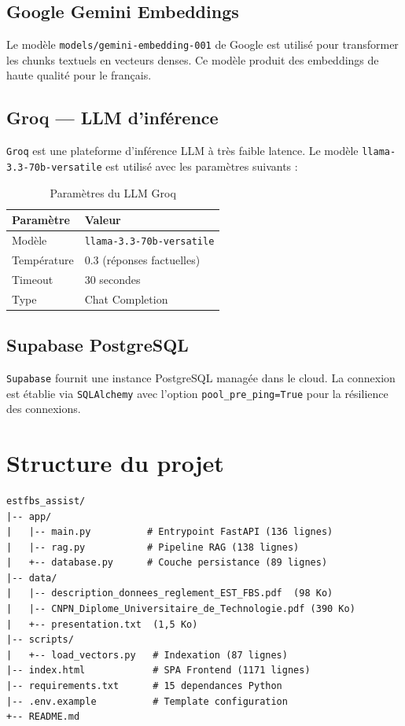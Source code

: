 \documentclass[12pt, a4paper, twoside]{report}
\newcommand{\tech}[1]{\texttt{\color{accent}#1}}
\begin{document}
\subsection{Google Gemini Embeddings}

Le modèle \texttt{models/gemini-embedding-001} de Google est utilisé pour transformer les chunks textuels en vecteurs denses. Ce modèle produit des embeddings de haute qualité pour le français.

\subsection{Groq --- LLM d'inférence}

\tech{Groq} est une plateforme d'inférence LLM à très faible latence. Le modèle \texttt{llama-3.3-70b-versatile} est utilisé avec les paramètres suivants :

\begin{table}[H]
\centering
\caption{Paramètres du LLM Groq}
\label{tab:llm}
\begin{tabular}{ll}
\toprule
\textbf{Paramètre} & \textbf{Valeur} \\
\midrule
Modèle         & \texttt{llama-3.3-70b-versatile} \\
Température    & 0.3 (réponses factuelles) \\
Timeout        & 30 secondes \\
Type           & Chat Completion \\
\bottomrule
\end{tabular}
\end{table}

\subsection{Supabase PostgreSQL}

\tech{Supabase} fournit une instance PostgreSQL managée dans le cloud. La connexion est établie via \tech{SQLAlchemy} avec l'option \texttt{pool\_pre\_ping=True} pour la résilience des connexions.

\section{Structure du projet}

\begin{lstlisting}[language={}, caption={Arborescence du projet}, label={lst:arbo}]
estfbs_assist/
|-- app/
|   |-- main.py          # Entrypoint FastAPI (136 lignes)
|   |-- rag.py           # Pipeline RAG (138 lignes)
|   +-- database.py      # Couche persistance (89 lignes)
|-- data/
|   |-- description_donnees_reglement_EST_FBS.pdf  (98 Ko)
|   |-- CNPN_Diplome_Universitaire_de_Technologie.pdf (390 Ko)
|   +-- presentation.txt  (1,5 Ko)
|-- scripts/
|   +-- load_vectors.py   # Indexation (87 lignes)
|-- index.html            # SPA Frontend (1171 lignes)
|-- requirements.txt      # 15 dependances Python
|-- .env.example          # Template configuration
+-- README.md
\end{lstlisting}
\end{document}

